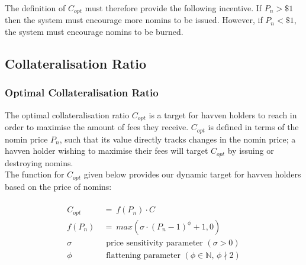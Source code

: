 \noindent The definition of $C_{opt}$ must therefore provide the following incentive. If $P_n > \$1$ then the system must encourage more nomins to be issued. However, if $P_n < \$1$, the system must encourage nomins to be burned.

\newpage

\subsection{Collateralisation Ratio}
\subsubsection{Optimal Collateralisation Ratio}

\noindent The optimal collateralisation ratio $C_{opt}$ is a target for havven
holders to reach in order to maximise the amount of fees they receive.
$C_{opt}$ is defined in terms of the nomin price $P_n$, such that its value directly tracks changes in the nomin price; a havven
holder wishing to maximise their fees will target $C_{opt}$ by issuing or destroying nomins. \\

\noindent The function for $C_{opt}$ given below provides our dynamic target
for havven holders based on the price of nomins:

\begin{gather} \label{eq:optcollateralisation}
\begin{align}
\begin{split}
C_{opt} \ &= \ f(P_{n}) \cdot C  \\ 
f(P_n) \ &= \ max(\sigma \cdot (P_n - 1)^{\phi} + 1, 0) \\
\sigma \ & \text{ \ price sensitivity parameter } (\sigma > 0)\\
\phi   \ & \text{ \ flattening parameter } (\phi \in \mathbb{N} \text{, } \phi \nmid 2) \\
\end{split}
\end{align}
\end{gather}


\begin{center}
\end{center}

